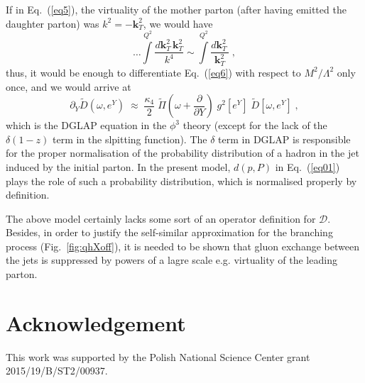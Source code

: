 \documentclass{PoS}
\newcommand{\be}{\begin{equation}}
\newcommand{\ee}[1]{\label{#1} \end{equation}}
\begin{document}
If in Eq.~(\ref{eq5}), the virtuality of the mother parton (after having emitted the daughter parton) was $k^2 = -\mathbf{k}_T^2$, we would have 
\be
\dots \int\limits^{Q^2} \frac{d\mathbf{k}^2_T \, \mathbf{k}^2_T}{k^4} \sim \int\limits^{Q^2} \frac{d\mathbf{k}^2_T \, }{\mathbf{k}^2_T }\;,
\ee{eq11}
thus, it would be enough to differentiate Eq.~(\ref{eq6}) with respect to $M^2/\Lambda^2$ only once, and we would arrive at 
\be
\partial_Y \tilde{D}\left(\omega, e^Y\right) \;\approx\;  \frac{\kappa_4}{2}  \; \tilde{\Pi}\left(\omega + \frac{\partial}{\partial Y} \right)  \; g^2\left[e^Y\right] \; \tilde{D}\left[\omega , e^Y \right] \;,
\ee{eq12}
which is the DGLAP equation in the $\phi^3$ theory (except for the lack of the $\delta(1-z)$ term in the slpitting function). The $\delta$ term in DGLAP is responsible for the proper normalisation of the probability distribution of a hadron in the jet induced by the initial parton. In the present model, $d(p,P)$ in Eq.~(\ref{eq01}) plays the role of such a probability distribution, which is normalised properly by definition.

The above model certainly lacks some sort of an operator definition for $\mathcal D$. Besides, in order to justify the self-similar approximation for the branching process (Fig.~\ref{fig:qhXoff}), it is needed to be shown that gluon exchange between the jets is suppressed by powers of a lagre scale e.g. virtuality of the leading parton.



\section*{Acknowledgement}
This work was supported by the Polish National Science Center grant 2015/19/B/ST2/00937.



\end{document}
